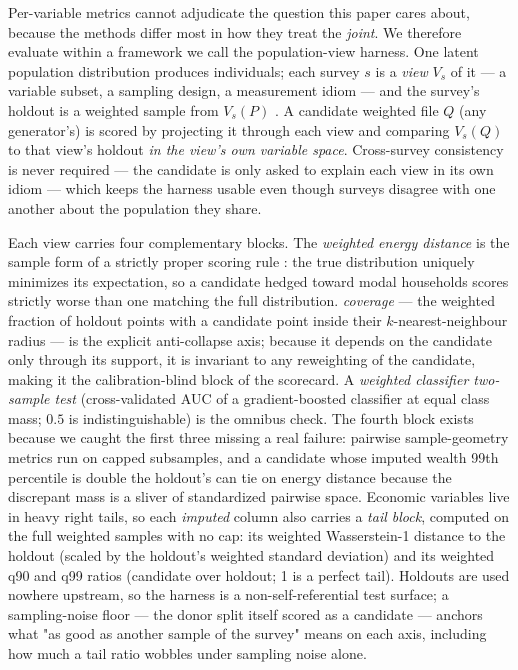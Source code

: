 Per-variable metrics cannot adjudicate the question this paper cares about,
because the methods differ most in how they treat the \emph{joint}. We
therefore evaluate within a framework we call the population-view harness. One
latent population distribution produces individuals; each survey $s$ is a
\emph{view} $V_s$ of it --- a variable subset, a sampling design, a
measurement idiom --- and the survey's holdout is a weighted sample from
$V_s(P)$ \citep{lohr2017combining}. A candidate weighted file $Q$ (any
generator's) is scored by projecting it through each view and comparing
$V_s(Q)$ to that view's holdout \emph{in the view's own variable space}.
Cross-survey consistency is never required --- the candidate is only asked to
explain each view in its own idiom --- which keeps the harness usable even
though surveys disagree with one another about the population they share.

Each view carries four complementary blocks. The \emph{weighted energy
distance} \citep{szekely2013energy} is the sample form of a strictly proper
scoring rule \citep{gneiting2007strictly}: the true distribution uniquely
minimizes its expectation, so a candidate hedged toward modal households
scores strictly worse than one matching the full distribution. \emph{\prdc{}
coverage} \citep{naeem2020reliable} --- the weighted fraction of holdout
points with a candidate point inside their $k$-nearest-neighbour radius ---
is the explicit anti-collapse axis; because it depends on the candidate only
through its support, it is invariant to any reweighting of the candidate,
making it the calibration-blind block of the scorecard. A \emph{weighted
classifier two-sample test} (cross-validated AUC of a gradient-boosted
classifier at equal class mass; $0.5$ is indistinguishable) is the omnibus
check. The fourth block exists because we caught the first three missing a
real failure: pairwise sample-geometry metrics run on capped subsamples, and
a candidate whose imputed wealth 99th percentile is double the holdout's can
tie on energy distance because the discrepant mass is a sliver of
standardized pairwise space. Economic variables live in heavy right tails, so
each \emph{imputed} column also carries a \emph{tail block}, computed on the
full weighted samples with no cap: its weighted Wasserstein-1 distance to the
holdout (scaled by the holdout's weighted standard deviation) and its
weighted q90 and q99 ratios (candidate over holdout; 1 is a perfect tail).
Holdouts are used nowhere upstream, so the harness is a non-self-referential
test surface; a sampling-noise floor --- the donor split itself scored as a
candidate --- anchors what "as good as another sample of the survey" means on
each axis, including how much a tail ratio wobbles under sampling noise
alone.

